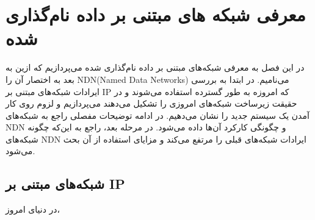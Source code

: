 

\chapter{معرفی شبکه های مبتنی بر داده نام‌گذاری شده}
در این فصل به معرفی شبکه‌های مبتنی بر داده نام‌گذاری شده می‌پردازیم که ازین به بعد به اختصار آن را NDN(Named Data Networks) می‌نامیم.  در ابتدا به بررسی ایرادات شبکه‌های مبتنی بر IP که امروزه به طور گسترده استفاده می‌شوند و در حقیقت زیرساخت شبکه‌های امروزی را تشکیل می‌دهند می‌پردازیم و لزوم روی کار آمدن یک سیستم جدید را نشان می‌دهیم. در ادامه توضیحات مفصلی راجع به شبکه‌های NDN و چگونگی کارکرد آن‌ها داده می‌شود. در مرحله بعد، راجع به این‌که چگونه شبکه‌های NDN ایرادات شبکه‌های قبلی را مرتفع می‌کند و مزایای استفاده از آن بحث می‌شود. 

\section{شبکه‌های مبتنی بر IP}
در دنیای امروز، 


